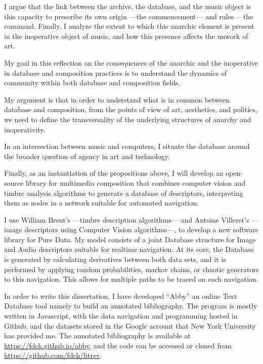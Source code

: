 I argue that the link between the archive, the database, and the music object is this capacity to prescribe its own origin ---the commencement--- and rules ---the command. Finally, I analyze the extent to which this anarchic element is present in the inoperative object of music, and how this presence affects the unwork of art. 

My goal in this reflection on the consequences of the anarchic and the inoperative in database and composition practices is to understand the dynamics of community within both database and composition fields. 

My argument is that in order to understand what is in common between database and composition, from the points of view of art, aesthetics, and politics, we need to define the transversality of the underlying structures of anarchy and inoperativity.



In an intersection between music and computers, I situate the database around the broader question of agency in art and technology. 


Finally, as an instantiation of the propositions above, I will develop an open-source library for multimedia composition that combines computer vision and timbre analysis algorithms to generate a database of descriptors, interpreting them as nodes in a network suitable for automated navigation. 


I use William Brent's  ---timbre description algorithms--- and Antoine Villeret's  ---image descriptors using Computer Vision algorithms---, to develop a new software library for Pure Data. My model consists of a joint Database structure for Image and Audio descriptors suitable for realtime navigation. At its core, the Database is generated by calculating derivatives between both data sets, and it is performed by applying random probabilities, markov chains, or chaotic generators to this navigation. This allows for multiple paths to be traced on each navigation.

In order to write this dissertation, I have developed ``Abby'' an online Text Database tool namely to build an annotated bibliography. The program is mostly written in Javascript, with the data navigation and programming hosted in Github, and the datasets stored in the Google account that New York University has provided me. The annotated bibliography is available at \url{https://fdch.github.io/abby}, and the code can be accessed or cloned from \url{https://github.com/fdch/litrev}.






